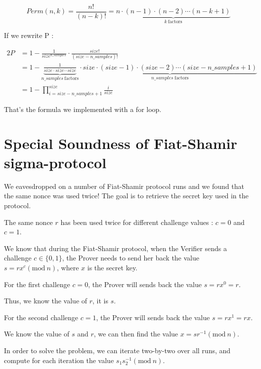 \documentclass[12pt]{article}
\begin{document}
$$
    Perm(n,k) = {\frac {n!}{(n-k)!}} = \underbrace {n\cdot (n-1)\cdot (n-2)\cdots (n-k+1)} _{k\ \mathrm {factors} }
$$

If we rewrite P :

\vspace{-2em}
\begin{alignat*}{2}
    P & = 1 - {\frac{1}{size^{n\_samples}}}\cdot{\frac {size!}{(size-n\_samples)!}}\\
    & = 1 - \underbrace {\frac{1}{size \cdot size \cdots size}} _{n\_samples\ \mathrm {factors} }\cdot \underbrace {size\cdot (size-1)\cdot (size-2)\cdots (size-n\_samples+1)} _{n\_samples\ \mathrm {factors} }\\
    & = 1 -     \prod_{i=size - n\_samples + 1}^{size} \frac{i}{size}
\end{alignat*}
\vspace{-1em}

That's the formula we implemented with a for loop.

\newpage
\section{Special Soundness of Fiat-Shamir sigma-protocol}

We eavesdropped on a number of Fiat-Shamir protocol runs and we found that the same nonce was used twice! The goal is to retrieve the secret key used in the protocol.

The same nonce $r$ has been used twice for different challenge values : $c = 0$ and $c = 1$.

We know that during the Fiat-Shamir protocol, when the Verifier sends a challenge $c \in \{0, 1\}$, the Prover needs to send her back the value $s = r x^c (\textrm{mod}\ n)$, where $x$ is the secret key.

For the first challenge $c = 0$, the Prover will sends back the value $s = r x^0 = r$.

Thus, we know the value of $r$, it is $s$.

For the second challenge $c = 1$, the Prover will sends back the value $s = r x^1 = r x$.

We know the value of $s$ and $r$, we can then find the value $x = s r^{-1} (\textrm{mod}\ n)$.

\vspace{2em}

In order to solve the problem, we can iterate two-by-two over all runs, and compute for each iteration the value $s_{1} s_{2}^{-1} (\textrm{mod}\ n)$.
\end{document}
